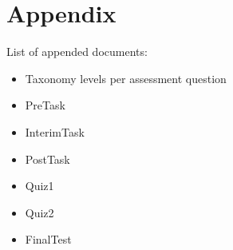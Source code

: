 \onecolumn

\section*{Appendix}
List of appended documents:
\begin{itemize}
\item Taxonomy levels per assessment question
\item PreTask
\item InterimTask
\item PostTask
\item Quiz1
\item Quiz2
\item FinalTest
\end{itemize}

\vspace{-1cm}







